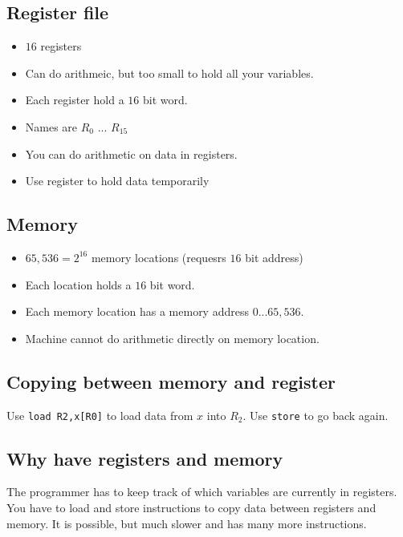 \subsection{Register file}\label{sub:register_file_one}

\begin{itemize}
	\item \(16\) registers
	\item Can do arithmeic, but too small to hold all your variables.
	\item Each register hold a \(16\) bit word.
	\item Names are \(R_0\) ...  \(R_{15}\)
	\item You can do arithmetic on data in registers.
	\item Use register to hold data temporarily
\end{itemize}

\subsection{Memory}\label{sub:memory}

\begin{itemize}
	\item \(65,536 = 2^{16}\) memory locations (requesrs \(16\) bit address)
	\item Each location holds a \(16\) bit word.
	\item Each memory location has a memory address \(0\)...\(65,536\).
	\item Machine cannot do arithmetic directly on memory location.
\end{itemize}


\subsection{Copying between memory and register}\label{sub:copying_between_memory_and_register}

Use \texttt{load R2,x[R0]}  to load data from \(x\) into \(R_2\).
Use \texttt{store} to go back again.


\subsection{Why have registers and memory}\label{sub:why_have_registers_and_memory}

The programmer has to keep track of which variables are currently in registers.
You have to load and store instructions to copy data between registers and memory.
It is possible, but much slower and has many more instructions.

